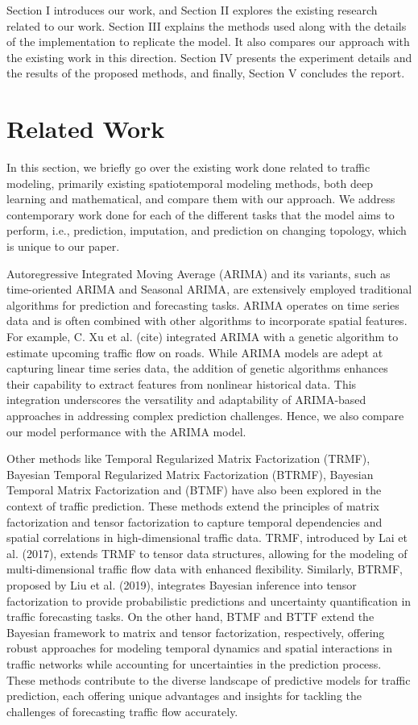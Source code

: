 \documentclass[conference]{IEEEtran}
\begin{document}
Section I introduces our work, and Section II explores the existing research related to our work. Section III explains the methods used along with the details of the implementation to replicate the model. It also compares our approach with the existing work in this direction. Section IV presents the experiment details and the results of the proposed methods, and finally, Section V concludes the report.

\section{Related Work}

In this section, we briefly go over the existing work done related to traffic modeling, primarily existing spatiotemporal modeling methods, both deep learning and mathematical, and compare them with our approach. We address contemporary work done for each of the different tasks that the model aims to perform, i.e., prediction, imputation, and prediction on changing topology, which is unique to our paper.

Autoregressive Integrated Moving Average (ARIMA) \cite{arima} and its variants, such as time-oriented ARIMA\cite{time_arima} and Seasonal ARIMA\cite{sarima}, are extensively employed traditional algorithms for prediction and forecasting tasks. ARIMA operates on time series data and is often combined with other algorithms to incorporate spatial features. For example, C. Xu et al. (cite) integrated ARIMA with a genetic algorithm to estimate upcoming traffic flow on roads. While ARIMA models are adept at capturing linear time series data, the addition of genetic algorithms enhances their capability to extract features from nonlinear historical data. This integration underscores the versatility and adaptability of ARIMA-based approaches in addressing complex prediction challenges. Hence, we also compare our model performance with the ARIMA model.

Other methods like Temporal Regularized Matrix Factorization (TRMF)\cite{trmf}, Bayesian Temporal Regularized Matrix Factorization (BTRMF)\cite{btrmf}, Bayesian Temporal Matrix Factorization and (BTMF)\cite{btrmf} have also been explored in the context of traffic prediction. These methods extend the principles of matrix factorization and tensor factorization to capture temporal dependencies and spatial correlations in high-dimensional traffic data. TRMF\cite{trmf}, introduced by Lai et al. (2017), extends TRMF to tensor data structures, allowing for the modeling of multi-dimensional traffic flow data with enhanced flexibility. Similarly, BTRMF\cite{btrmf}, proposed by Liu et al. (2019), integrates Bayesian inference into tensor factorization to provide probabilistic predictions and uncertainty quantification in traffic forecasting tasks. On the other hand, BTMF and BTTF extend the Bayesian framework to matrix and tensor factorization, respectively, offering robust approaches for modeling temporal dynamics and spatial interactions in traffic networks while accounting for uncertainties in the prediction process. These methods contribute to the diverse landscape of predictive models for traffic prediction, each offering unique advantages and insights for tackling the challenges of forecasting traffic flow accurately.
\end{document}
